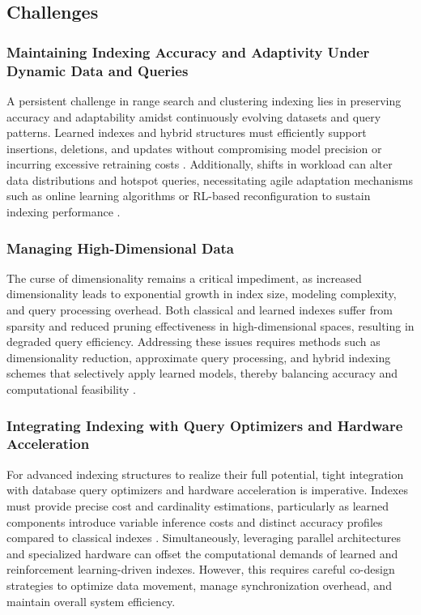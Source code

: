 \documentclass[11pt]{article}
\begin{document}
\subsection{Challenges}

\subsubsection{Maintaining Indexing Accuracy and Adaptivity Under Dynamic Data and Queries}

A persistent challenge in range search and clustering indexing lies in preserving accuracy and adaptability amidst continuously evolving datasets and query patterns. Learned indexes and hybrid structures must efficiently support insertions, deletions, and updates without compromising model precision or incurring excessive retraining costs \cite{ref34}. Additionally, shifts in workload can alter data distributions and hotspot queries, necessitating agile adaptation mechanisms such as online learning algorithms or RL-based reconfiguration to sustain indexing performance \cite{ref33}.

\subsubsection{Managing High-Dimensional Data}

The curse of dimensionality remains a critical impediment, as increased dimensionality leads to exponential growth in index size, modeling complexity, and query processing overhead. Both classical and learned indexes suffer from sparsity and reduced pruning effectiveness in high-dimensional spaces, resulting in degraded query efficiency. Addressing these issues requires methods such as dimensionality reduction, approximate query processing, and hybrid indexing schemes that selectively apply learned models, thereby balancing accuracy and computational feasibility \cite{ref31,ref35}.

\subsubsection{Integrating Indexing with Query Optimizers and Hardware Acceleration}

For advanced indexing structures to realize their full potential, tight integration with database query optimizers and hardware acceleration is imperative. Indexes must provide precise cost and cardinality estimations, particularly as learned components introduce variable inference costs and distinct accuracy profiles compared to classical indexes \cite{ref31,ref34}. Simultaneously, leveraging parallel architectures and specialized hardware can offset the computational demands of learned and reinforcement learning-driven indexes. However, this requires careful co-design strategies to optimize data movement, manage synchronization overhead, and maintain overall system efficiency.
\end{document}
